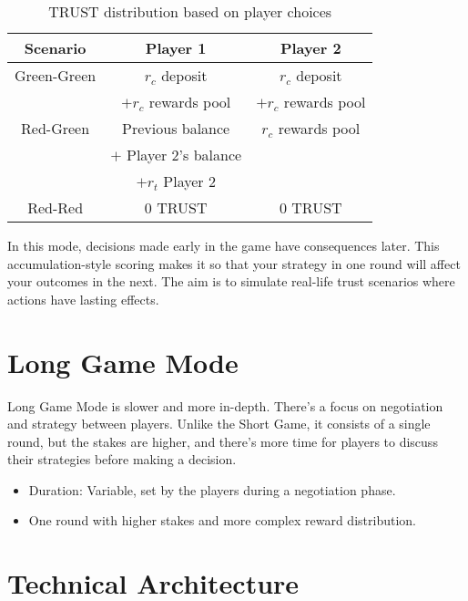 \documentclass[table, twocolumn]{article}
\begin{document}
\begin{table}[!htb]
  \centering
  \begin{tabular}{|c|c|c|}
    \hline \rowcolor{gray!20}
    Scenario        & Player 1                 & Player 2                 \\ \hline
    Green-Green     & $r_c$ deposit       & $r_c$ deposit       \\
                    & $+r_c$ rewards pool & $+r_c$ rewards pool \\ \hline
    Red-Green       & Previous balance         & $r_c$ rewards pool  \\
                    & $+$ Player 2's balance   &                          \\
                    & $+r_t$ Player 2     &                          \\ \hline
    Red-Red         & 0 TRUST                  & 0 TRUST                  \\ \hline
  \end{tabular}
  \caption{TRUST distribution based on player choices}
  \label{tab:trust-distribution}
\end{table}

In this mode, decisions made early in the game have consequences later. This accumulation-style scoring makes it so that your strategy in one round will affect your outcomes in the next. The aim is to simulate real-life trust scenarios where actions have lasting effects.

\section{Long Game Mode} \label{sec:long-game-mode}

Long Game Mode is slower and more in-depth. There’s a focus on negotiation and strategy between players. Unlike the Short Game, it consists of a single round, but the stakes are higher, and there’s more time for players to discuss their strategies before making a decision.

\begin{itemize}
    \item Duration: Variable, set by the players during a negotiation phase.
    \item One round with higher stakes and more complex reward distribution.
\end{itemize}

\section{Technical Architecture}
\end{document}
